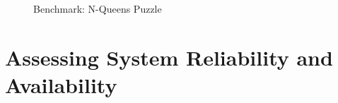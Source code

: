 \begin{figure}[h]
     \begin{center}
    \end{center}
    \caption{Benchmark: N-Queens Puzzle}
   \label{nqueens_efficiency}
\end{figure}



\section{Assessing System Reliability and Availability}
\label{reliability}

